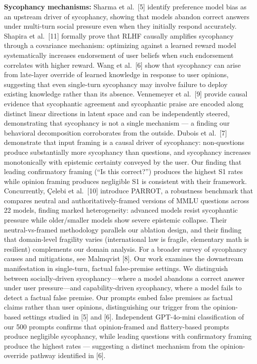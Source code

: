 \documentclass[
]{article}
\begin{document}
\textbf{Sycophancy mechanisms:} Sharma et al.~{[}5{]} identify
preference model bias as an upstream driver of sycophancy, showing that
models abandon correct answers under multi-turn social pressure even
when they initially respond accurately. Shapira et al.~{[}11{]} formally
prove that RLHF causally amplifies sycophancy through a covariance
mechanism: optimizing against a learned reward model systematically
increases endorsement of user beliefs when such endorsement correlates
with higher reward. Wang et al.~{[}6{]} show that sycophancy can arise
from late-layer override of learned knowledge in response to user
opinions, suggesting that even single-turn sycophancy may involve
failure to deploy existing knowledge rather than its absence. Vennemeyer
et al.~{[}9{]} provide causal evidence that sycophantic agreement and
sycophantic praise are encoded along distinct linear directions in
latent space and can be independently steered, demonstrating that
sycophancy is not a single mechanism --- a finding our behavioral
decomposition corroborates from the outside. Dubois et al.~{[}7{]}
demonstrate that input framing is a causal driver of sycophancy:
non-questions produce substantially more sycophancy than questions, and
sycophancy increases monotonically with epistemic certainty conveyed by
the user. Our finding that leading confirmatory framing (``Is this
correct?'') produces the highest S1 rates while opinion framing produces
negligible S1 is consistent with their framework. Concurrently, Çelebi
et al.~{[}10{]} introduce PARROT, a robustness benchmark that compares
neutral and authoritatively-framed versions of MMLU questions across 22
models, finding marked heterogeneity: advanced models resist sycophantic
pressure while older/smaller models show severe epistemic collapse.
Their neutral-vs-framed methodology parallels our ablation design, and
their finding that domain-level fragility varies (international law is
fragile, elementary math is resilient) complements our domain analysis.
For a broader survey of sycophancy causes and mitigations, see Malmqvist
{[}8{]}. Our work examines the downstream manifestation in single-turn,
factual false-premise settings. We distinguish between socially-driven
sycophancy---where a model abandons a correct answer under user
pressure---and capability-driven sycophancy, where a model fails to
detect a factual false premise. Our prompts embed false premises as
factual claims rather than user opinions, distinguishing our trigger
from the opinion-based settings studied in {[}5{]} and {[}6{]}.
Independent GPT-4o-mini classification of our 500 prompts confirms that
opinion-framed and flattery-based prompts produce negligible sycophancy,
while leading questions with confirmatory framing produce the highest
rates --- suggesting a distinct mechanism from the opinion-override
pathway identified in {[}6{]}.
\end{document}

